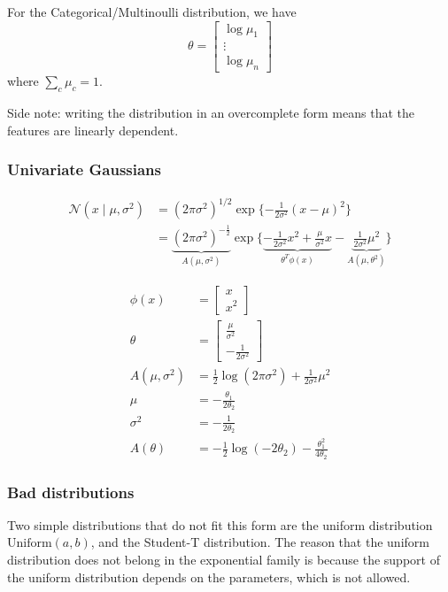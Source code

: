 \documentclass{article}
\begin{document}
For the Categorical/Multinoulli distribution, we have
$$\theta = \begin{bmatrix}
\log \mu_1 \\
\vdots \\
\log \mu_n
\end{bmatrix}
$$
where $\sum_{c} \mu_c = 1$.

Side note: writing the distribution in an overcomplete form means that the features are linearly dependent.

\subsubsection{Univariate Gaussians}

\begin{align*}
\mathcal{N} ( x \mid \mu, \sigma^2) &= (2 \pi \sigma^2)^{1/2} \exp \{ -\frac{1}{2\sigma^2} (x - \mu)^2 \} \\
&= \underbrace{(2\pi \sigma^2)^{-\frac{1}{2}}}_{A(\mu, \sigma^2)} \exp\{\underbrace{-\frac{1}{2\sigma^2}x^2 + \frac{\mu}{\sigma^2}x}_{\theta^T \phi(x)} - \underbrace{\frac{1}{2\sigma^2} \mu^2}_{A(\mu, \theta^2)}\}
\end{align*}

\begin{align*}
\phi(x) &= \begin{bmatrix} x \\ x^2 \end{bmatrix} \\
\theta &= \begin{bmatrix} \frac{\mu}{\sigma^2} \\ -\frac{1}{2\sigma^2} \end{bmatrix}\\
A(\mu, \sigma^2) &= \frac{1}{2}\log(2\pi\sigma^2) + \frac{1}{2\sigma^2}\mu^2
\\
\mu &= - \frac{\theta_1}{2\theta_2}
\\
\sigma^2 &= - \frac{1}{2\theta_2}
\\
A(\theta) &= - \frac12 \log( -2 \theta_2) - \frac{\theta_1^2}{4 \theta_2}
\end{align*}

\subsubsection{Bad distributions}
Two simple distributions that do not fit this form are the uniform distribution $\text{Uniform}(a, b)$, and the Student-T distribution. The reason that the uniform distribution does not belong in the exponential family is because the support of the uniform distribution depends on the parameters, which is not allowed.
\end{document}
